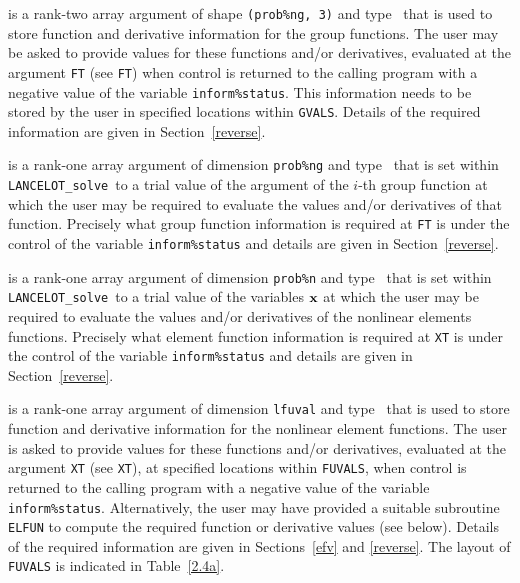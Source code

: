 \documentclass{galahad}
\newcommand{\fullpackagename}{LANC\-E\-LOT}
\newcommand{\solver}{{\tt \fullpackagename\_solve}}
\begin{document}
\begin{description}
 is a rank-two \intentout array argument of
shape {\tt (prob\%ng, 3)} and type \realdp\,
that is used to store function and derivative information for the
group functions. The user may be asked to provide values for these functions
and/or derivatives, evaluated at
the argument {\tt FT} (see {\tt FT})
when control is returned to the calling
program with a negative value of the variable {\tt inform\%status}.
This information needs to be stored by the user
in specified locations within {\tt GVALS}.
Details of the required information are given in Section~\ref{reverse}.

 is a rank-one \intentinout array argument of
dimension {\tt prob\%ng} and type \realdp\, that is set within \solver\
to a trial value of the argument of the $i$-th group function
at which the user may be required to evaluate the values and/or derivatives
of that function. Precisely what group function information
is required at {\tt FT} is under the control of the
variable {\tt inform\%status} and details are given in Section~\ref{reverse}.

 is a rank-one \intentinout array argument of
dimension {\tt prob\%n} and type \realdp\, that is set within \solver\
to a trial value of the variables ${\mathbf{x}}$ at which the
user may be required to evaluate the values and/or derivatives
of the nonlinear elements functions. Precisely what element function
information is required at {\tt XT} is under the control of the
variable {\tt inform\%status} and details are given in Section~\ref{reverse}.

\itt{FUVALS} is a rank-one \intentinout array argument of
dimension {\tt lfuval} and type \realdp\, that is used to store
function and derivative information for the nonlinear element functions.
The user is asked to provide values for these functions and/or derivatives,
evaluated at the argument {\tt XT} (see {\tt XT}), at specified
locations within {\tt FUVALS}, when control is returned to the calling
program with a negative value of the variable {\tt inform\%status}.
Alternatively, the user may have provided a suitable subroutine {\tt ELFUN}
to compute the required function or derivative values (see below). Details
of the required information are given in Sections~\ref{efv} and \ref{reverse}.
The layout of {\tt FUVALS} is indicated in Table~\ref{2.4a}.


\end{description}
\end{document}
